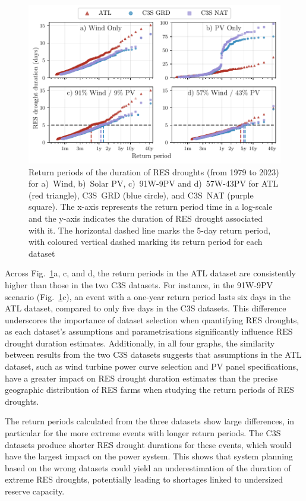 \documentclass[preprint, 12pt]{elsarticle}
\begin{document}
\begin{figure}[!ht]
	\centering
	\includegraphics[width=\textwidth]{droughts_return_periods.pdf}
	\caption{Return periods of the duration of RES droughts  (from 1979 to 2023) for a)~Wind, b)~Solar PV, c)~91W-9PV and d)~57W-43PV for ATL (red triangle), C3S~GRD (blue circle), and C3S~NAT (purple square). The x-axis represents the return period time in a log-scale and the y-axis indicates the duration of RES drought associated with it. The horizontal dashed line marks the 5-day return period, with coloured vertical dashed marking its return period for each dataset}
	\label{fig:return_periods}
\end{figure}

Across Fig.~\ref{fig:return_periods}a, c, and d, the return periods in the ATL dataset are consistently higher than those in the two C3S datasets. For instance, in the 91W-9PV scenario (Fig.~\ref{fig:return_periods}c), an event with a one-year return period lasts six days in the ATL dataset, compared to only five days in the C3S datasets. This difference underscores the importance of dataset selection when quantifying RES droughts, as each dataset’s assumptions and parametrisations significantly influence RES drought duration estimates. Additionally, in all four graphs, the similarity between results from the two C3S datasets suggests that assumptions in the ATL dataset, such as wind turbine power curve selection and PV panel specifications, have a greater impact on RES drought duration estimates than the precise geographic distribution of RES farms when studying the return periods of RES droughts.

The return periods calculated from the three datasets show large differences, in particular for the more extreme events with longer return periods. The C3S datasets produce shorter RES drought durations for these events, which would have the largest impact on the power system. This shows that system planning based on the wrong datasets could yield an underestimation of the duration of extreme RES droughts, potentially leading to shortages linked to undersized reserve capacity.
\end{document}
